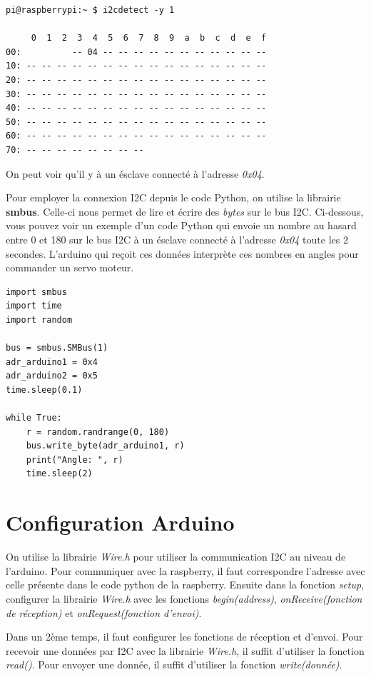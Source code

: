 \documentclass{eurobot_report}
\begin{document}
\begin{verbatim}
pi@raspberrypi:~ $ i2cdetect -y 1

     0  1  2  3  4  5  6  7  8  9  a  b  c  d  e  f
00:          -- 04 -- -- -- -- -- -- -- -- -- -- -- 
10: -- -- -- -- -- -- -- -- -- -- -- -- -- -- -- -- 
20: -- -- -- -- -- -- -- -- -- -- -- -- -- -- -- -- 
30: -- -- -- -- -- -- -- -- -- -- -- -- -- -- -- -- 
40: -- -- -- -- -- -- -- -- -- -- -- -- -- -- -- -- 
50: -- -- -- -- -- -- -- -- -- -- -- -- -- -- -- -- 
60: -- -- -- -- -- -- -- -- -- -- -- -- -- -- -- -- 
70: -- -- -- -- -- -- -- -- 
\end{verbatim}

On peut voir qu'il y à un ésclave connecté à l'adresse \textit{0x04}.

Pour employer la connexion I2C depuis le code Python, on utilise la librairie \textbf{smbus}. Celle-ci nous permet de lire et écrire des \textit{bytes} sur le bus I2C. Ci-dessous, vous pouvez voir un exemple d'un code Python qui envoie un nombre au hasard entre 0 et 180 sur le bus I2C à un ésclave connecté à l'adresse \textit{0x04} toute les 2 secondes. L'arduino qui reçoit ces données interprète ces nombres en angles pour commander un servo moteur.

\begin{verbatim}
import smbus
import time
import random

bus = smbus.SMBus(1)
adr_arduino1 = 0x4
adr_arduino2 = 0x5
time.sleep(0.1)

while True:
    r = random.randrange(0, 180)
    bus.write_byte(adr_arduino1, r)
    print("Angle: ", r)
    time.sleep(2)
\end{verbatim}


\section{Configuration Arduino}
On utilise la librairie \textit{Wire.h} pour utiliser la communication I2C au niveau de l'arduino. Pour communiquer avec la raspberry, il faut correspondre l'adresse avec celle présente dans le code python de la raspberry. Ensuite dans la fonction \textit{setup}, configurer la librairie \textit{Wire.h} avec les fonctions \textit{begin(address)}, \textit{onReceive(fonction de réception)} et \textit{onRequest(fonction d'envoi)}. 

Dans un 2ème temps, il faut configurer les fonctions de réception et d'envoi. Pour recevoir une données par I2C avec la librairie \textit{Wire.h}, il suffit d'utiliser la fonction \textit{read()}. Pour envoyer une donnée, il suffit d'utiliser la fonction \textit{write(donnée)}. 
\end{document}
